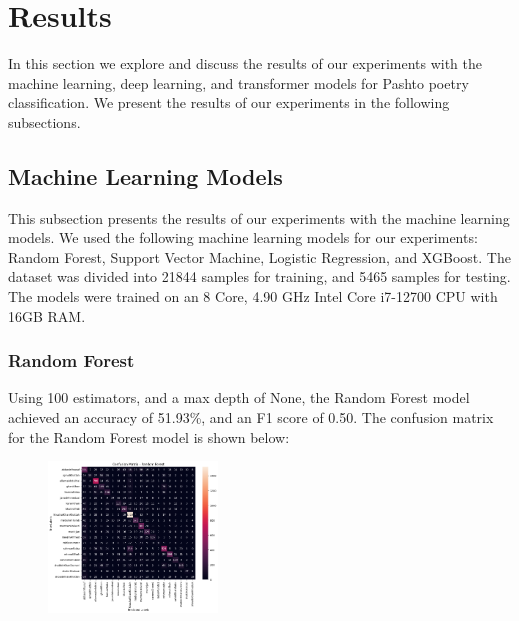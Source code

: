 \section{Results}

In this section we explore and discuss the results of our experiments with the machine learning, deep learning, and transformer models for Pashto poetry classification. We present the results of our experiments in the following subsections. 

\subsection{Machine Learning Models}

This subsection presents the results of our experiments with the machine learning models. We used the following machine learning models for our experiments: Random Forest, Support Vector Machine, Logistic Regression, and XGBoost. The dataset was divided into 21844 samples for training, and 5465 samples for testing. The models were trained on an 8 Core, 4.90 GHz Intel Core i7-12700 CPU with 16GB RAM. 

\subsubsection{Random Forest}
Using 100 estimators, and a max depth of None, the Random Forest model achieved an accuracy of 51.93\%, and an F1 score of 0.50. The confusion matrix for the Random Forest model is shown below:
\begin{figure}[H]
    \centering
    \includegraphics[width=0.4\textwidth]{rf_confmat.png}
\end{figure}

